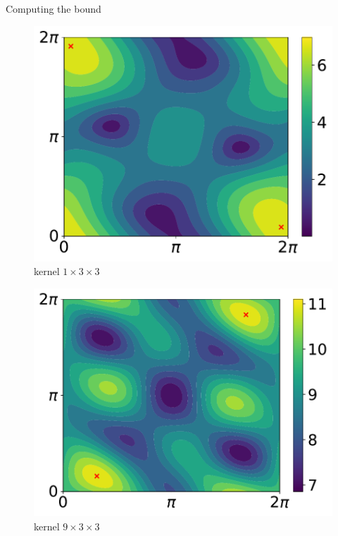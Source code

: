 \begin{frame}{Computing the bound}

  \begin{figure}[ht]
    \centering
    \begin{minipage}{.22\linewidth}
      \centering
      \includegraphics[scale=0.16]{images/contour_poly_200_1_1_3.pdf} \\ {\small kernel $1\times3\times3$}
    \end{minipage}
    \begin{minipage}{.22\linewidth}
	\centering
	\includegraphics[scale=0.16]{images/contour_poly_200_1_9_3.pdf} \\ {\small kernel $9\times3\times3$}

\end{minipage}
\end{figure}
\end{frame}
